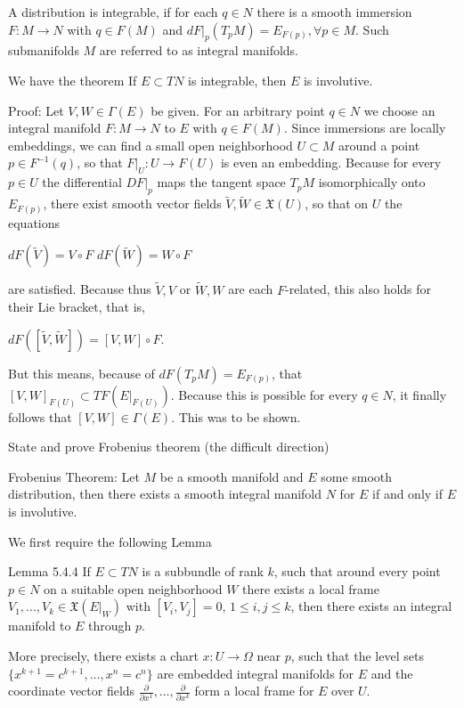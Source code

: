 A distribution is integrable, if for each \( q \in N \) there is a smooth immersion 
\( F : M \to N\) with \( q \in F(M) \) and \( dF|_p(T_pM) = E_{F(p)}, \forall p \in M \).
Such submanifolds \( M \) are referred to as integral manifolds.

We have the theorem
If \( E \subset TN \) is integrable, then \( E \) is involutive.

Proof: 
Let \(V, W \in \Gamma(E)\) be given. For an arbitrary point \(q \in N\) we choose an integral manifold \(F: M \to N\) to \(E\) with \(q \in F(M)\). 
Since immersions are locally embeddings, we can find a small open neighborhood \(U \subset M\) around a point \(p \in F^{-1}(q)\), 
so that \(F|_U: U \to F(U)\) is even an embedding. 
Because for every \(p \in U\) the differential \(DF|_p\) maps the tangent space \(T_pM\) isomorphically onto \(E_{F(p)}\), 
there exist smooth vector fields \(\tilde{V}, \tilde{W} \in \mathfrak{X}(U)\), so that on \(U\) the equations

\(dF(\tilde{V}) = V \circ F\) 
\(dF(\tilde{W}) = W \circ F\)

are satisfied. Because thus \(\tilde{V}, V\) or \(\tilde{W}, W\) are each \(F\)-related, this also holds for their Lie bracket, that is,

\(dF([\tilde{V}, \tilde{W}]) = [V, W] \circ F.\)

But this means, because of \(dF(T_pM) = E_{F(p)}\), that \([V, W]_{F(U)} \subset TF(E|_{F(U)})\). 
Because this is possible for every \(q \in N\), it finally follows that \([V, W] \in \Gamma(E)\). This was to be shown.



State and prove Frobenius theorem (the difficult direction)

Frobenius Theorem:
Let \( M \) be a smooth manifold and \( E \) some smooth distribution,
then there exists a smooth integral manifold \( N \) for \( E \) if and only if
\( E \) is involutive.

We first require the following Lemma

Lemma 5.4.4
If \(E \subset TN\) is a subbundle of rank \(k\), such that around every point \(p \in N\) on a suitable open neighborhood \(W\) 
there exists a local frame \(V_1, \dots, V_k \in \mathfrak{X}(E|_W)\) with \([V_i, V_j] = 0\), \(1 \leq i, j \leq k\), 
then there exists an integral manifold to \(E\) through \(p\). 

More precisely, there exists a chart \(x : U \to \Omega\) near \(p\), such that the level sets \(\{x^{k+1} = c^{k+1}, \dots, x^n = c^n\}\) are embedded integral manifolds for \(E\) and the coordinate vector fields \(\frac{\partial}{\partial x^1}, \dots, \frac{\partial}{\partial x^k}\) form a local frame for \(E\) over \(U\).


